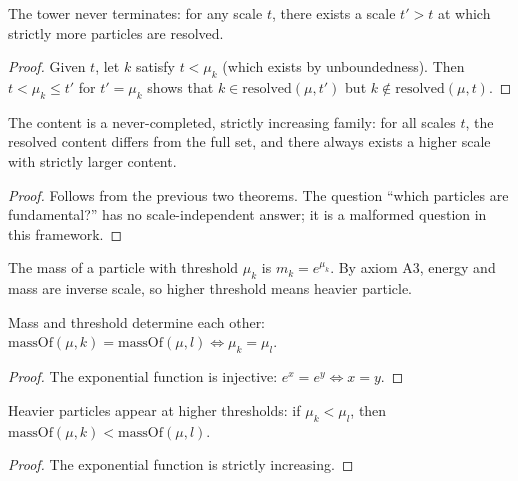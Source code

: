 \begin{theorem}
The tower never terminates: for any scale $t$, there exists a scale $t' > t$ at which strictly more particles are resolved.
\end{theorem}

\begin{proof}
Given $t$, let $k$ satisfy $t < \mu_k$ (which exists by unboundedness). Then $t < \mu_k \leq t'$ for $t' = \mu_k$ shows that $k \in \mathrm{resolved}(\mu, t')$ but $k \notin \mathrm{resolved}(\mu, t)$.
\end{proof}

\begin{theorem}
The content is a never-completed, strictly increasing family: for all scales $t$, the resolved content differs from the full set, and there always exists a higher scale with strictly larger content.
\end{theorem}

\begin{proof}
Follows from the previous two theorems. The question ``which particles are fundamental?'' has no scale-independent answer; it is a malformed question in this framework.
\end{proof}

\begin{definition}
The mass of a particle with threshold $\mu_k$ is $m_k = e^{\mu_k}$. By axiom A3, energy and mass are inverse scale, so higher threshold means heavier particle.
\end{definition}

\begin{theorem}
Mass and threshold determine each other: $\mathrm{massOf}(\mu, k) = \mathrm{massOf}(\mu, l) \iff \mu_k = \mu_l$.
\end{theorem}

\begin{proof}
The exponential function is injective: $e^x = e^y \iff x = y$.
\end{proof}

\begin{theorem}
Heavier particles appear at higher thresholds: if $\mu_k < \mu_l$, then $\mathrm{massOf}(\mu, k) < \mathrm{massOf}(\mu, l)$.
\end{theorem}

\begin{proof}
The exponential function is strictly increasing.
\end{proof}

